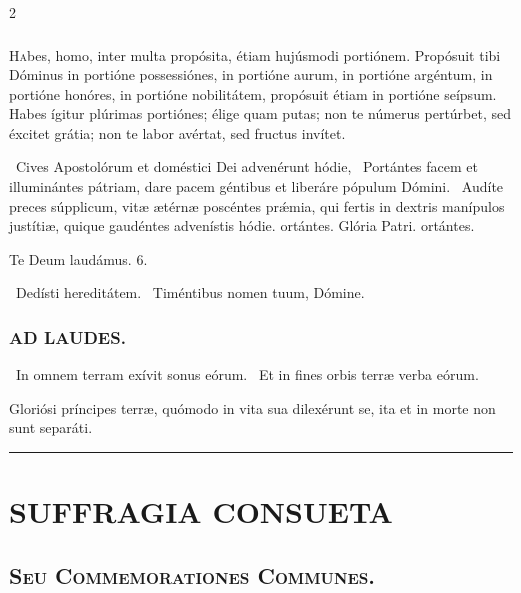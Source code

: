 \documentclass[9pt,twoside]{extarticle}
\begin{document}
\begin{multicols}{2}
{\subsubsection*{\center {}}
\lettrine{H}abes, homo, inter multa propósita, étiam hujúsmodi portiónem. Propósuit tibi Dóminus in portióne possessiónes, in portióne aurum, in portióne argéntum, in portióne honóres, in portióne nobilitátem, propósuit étiam in portióne seípsum. Habes ígitur plúrimas portiónes; élige quam putas; non te númerus pertúrbet, sed éxcitet grátia; non te labor avértat, sed fructus invítet.

\begin{tightlist}{}
\item {}~Cives Apostolórum et doméstici Dei advenérunt hódie, \textred{*}~Portántes facem et illuminántes pátriam, dare pacem géntibus et liberáre pópulum Dómini. ~Audíte preces súpplicum, vitæ ætérnæ poscéntes prǽmia, qui fertis in dextris manípulos justítiæ, quique gaudéntes advenístis hódie. ortántes. Glória Patri. ortántes.
\item Te Deum laudámus. 6.
\item {}~Dedísti hereditátem. ~Timéntibus nomen tuum, Dómine.
\end{tightlist}

\subsubsection*{\center \textsc{AD LAUDES.}}
\begin{tightlist}{}
\item {}~In omnem terram exívit sonus eórum. ~Et in fines orbis terræ verba eórum.
\item {} Gloriósi príncipes terræ, quómodo in vita sua dilexérunt se, ita et in morte non sunt separáti.
\end{tightlist}

\begin{center}\textcolor{red}{\rule{\linewidth}{0.5pt}} \end{center}
\clearpage
\section*{\center \textsc{SUFFRAGIA CONSUETA}}
\subsection*{\center \textsc{Seu Commemorationes Communes.}}

}
\end{multicols}
\end{document}
